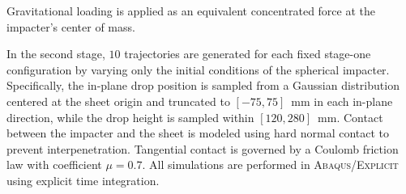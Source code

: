 %
Gravitational loading is applied as an equivalent concentrated force at the impacter's center of mass. 
%
\par
%
In the second stage, $10$ trajectories are generated for each fixed stage-one configuration by varying only the initial conditions of the spherical impacter. 
%
Specifically, the in-plane drop position is sampled from a Gaussian distribution centered at the sheet origin and truncated to $[-75,75]$~mm in each in-plane direction, while the drop height is sampled within $[120,280]$~mm.
%
Contact between the impacter and the sheet is modeled using hard normal contact to prevent interpenetration. 
%
Tangential contact is governed by a Coulomb friction law with coefficient $\mu=0.7$. 
%
All simulations are performed in \textsc{Abaqus/Explicit} using explicit time integration.

%
